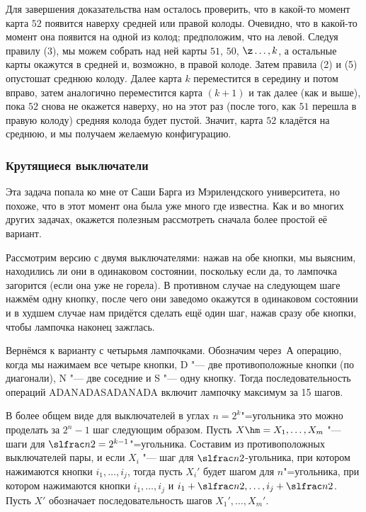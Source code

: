 \documentclass[twoside]{book}
\begin{document}
Для завершения доказательства нам осталось проверить, что в какой-то момент карта $52$ появится наверху средней или правой колоды.
Очевидно, что в какой-то момент она появится на одной из колод;
предположим, что на левой.
Следуя правилу (3), мы можем собрать над ней карты $51$, $50$, $\z\dots, k$, а остальные карты окажутся в средней и, возможно, в правой колоде.
Затем правила (2) и (5) опустошат среднюю колоду.
Далее карта $k$ переместится в середину и потом вправо, затем аналогично переместится карта $(k+1)$ и так далее (как и выше), пока $52$ снова не окажется наверху, но на этот раз (после того, как $51$ перешла в правую колоду) средняя колода будет пустой.
Значит, карта $52$ кладётся на среднюю, и мы получаем желаемую конфигурацию.

\subsubsection*{Крутящиеся выключатели}%

Эта задача попала ко мне от Саши Барга из Мэрилендского университета,
но похоже, что в этот момент она была уже много где известна.
Как и
во многих других задачах, окажется полезным рассмотреть сначала более
простой её вариант.

\medskip

Рассмотрим версию с двумя выключателями: нажав на обе кнопки, мы выясним, находились ли они в одинаковом состоянии, поскольку если да, то лампочка загорится (если она уже не горела).
В противном случае на следующем шаге нажмём одну кнопку, после чего они
заведомо окажутся в одинаковом состоянии и в худшем случае нам придётся сделать ещё один шаг, нажав сразу обе кнопки, чтобы лампочка наконец зажглась.

Вернёмся к варианту с четырьмя лампочками.
Обозначим через~А операцию, когда мы нажимаем все четыре кнопки, 
D "--- две противоположные кнопки (по диагонали), 
N "--- две соседние и 
S "--- одну кнопку.
Тогда последовательность операций ADANADASADANADA включит лампочку максимум за 15 шагов. %

В более общем виде для выключателей в углах $n=2^k$"=угольника это можно проделать за $2^{n}-1$ шаг следующим образом.
Пусть $X\hm=X_1,\dots,X_m$ "--- шаги для $\slfrac n2=2^{k-1}$"=угольника.
Составим из противоположных выключателей пары, и если $X_i$ "--- шаг для $\slfrac n2$-угольника, при котором нажимаются кнопки $i_1,\dots,i_j$, тогда пусть $X_i'$ будет шагом для $n$"=угольника, при котором нажимаются кнопки $i_1,\dots,i_j$ и $i_1+\slfrac n2,\dots,i_j+\slfrac n2$.
Пусть $X'$ обозначает последовательность шагов $X_1',\dots,X_m'$.
\end{document}
